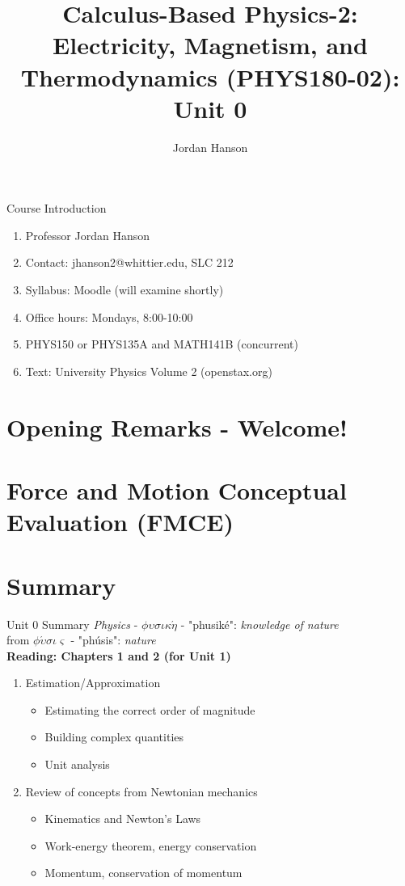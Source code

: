 \documentclass{beamer}
\title{Calculus-Based Physics-2: Electricity, Magnetism, and Thermodynamics (PHYS180-02): Unit 0}
\author{Jordan Hanson}
\institute{Whittier College Department of Physics and Astronomy}
\begin{document}
\maketitle

\begin{frame}{Course Introduction}
\begin{enumerate}
\item Professor Jordan Hanson
\item Contact: jhanson2@whittier.edu, SLC 212
\item Syllabus: Moodle (will examine shortly)
\item Office hours: Mondays, 8:00-10:00
\item PHYS150 or PHYS135A and MATH141B (concurrent)
\item Text: University Physics Volume 2 (openstax.org)
\end{enumerate}
\end{frame}

\section{Opening Remarks - Welcome!}

\section{Force and Motion Conceptual Evaluation (FMCE)}

\section{Summary}

\begin{frame}{Unit 0 Summary}
\textit{Physics} - $\phi\upsilon\sigma\iota\kappa\acute{\eta}$ - "phusik\'e": \textit{knowledge of nature} \\
from $\phi\acute{\upsilon}\sigma\iota\varsigma$ - "ph\'usis": \textit{nature} \\
\textbf{Reading: Chapters 1 and 2 (for Unit 1)}
\begin{enumerate}
\item Estimation/Approximation
\begin{itemize}
\item \alert{Estimating} the correct order of magnitude
\item \alert{Building} complex quantities
\item \alert{Unit analysis}
\end{itemize}
\item Review of concepts from Newtonian mechanics
\begin{itemize}
\item Kinematics and \alert{Newton's Laws}
\item Work-energy theorem, energy conservation
\item Momentum, conservation of momentum
\end{itemize}
\end{enumerate}
\end{frame}
\end{document}
